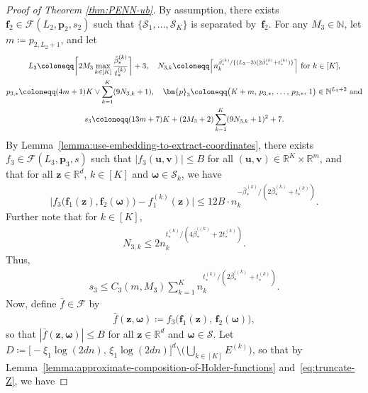 \documentclass[12pt]{article}
\begin{document}
\begin{proof}[Proof of Theorem \ref{thm:PENN-ub}]
    By assumption, there exists $\bm f_2 \in \mathcal{F}(L_2,\bm p_2,s_2)$ such that $\{\mathcal{S}_1,\ldots,\mathcal{S}_K\}$ is separated by~$\bm f_2$.  For any $M_3 \in \mathbb{N}$, let $m\coloneqq p_{2,L_2+1}$, and let
    \begin{gather*}
        L_3 \coloneqq \biggl\lceil 2M_3 \max_{k\in[K]} \frac{\bar{\beta}^{(k)}_*}{t^{(k)}_*} \biggr\rceil  +3,\quad
        N_{3,k} \coloneqq \Bigl\lceil n_k^{\bar\beta^{(k)}_* / \{(L_3-3)(2\bar\beta^{(k)}_* + t^{(k)}_*)\}} \Bigr\rceil \text{ for }k\in[K],\\
        p_{3,*} \coloneqq (4m+1)K \vee \sum_{k=1}^K (9N_{3,k}+1),\quad
        \bm{p}_3 \coloneqq \bigl(K+m,\, p_{3,*},\,\ldots,\,p_{3,*}, \,1\bigr) \in \mathbb{N}^{L_3+2} \text{ and}\\
        s_3 \coloneqq (13m+7)K + (2M_3+2)\sum_{k=1}^K (9N_{3,k}+1)^2 + 7.
    \end{gather*}
    By Lemma~\ref{lemma:use-embedding-to-extract-coordinates}, there exists $f_3 \in \mathcal{F}(L_3,\bm p_3, s)$ such that $|f_3(\bm u, \bm v)| \leq B$ for all $(\bm u,\bm v) \in \mathbb{R}^K \times \mathbb{R}^m$, and that for all $\bm z \in \mathbb{R}^d$, $k\in[K]$ and $\bm\omega \in \mathcal{S}_k$, we have
    \begin{align}
        \bigl| f_3\bigl(\bm f_1(\bm z), \bm f_2(\bm\omega)\bigr) - f_1^{(k)}(\bm z) \bigr| \leq 12B \cdot n_k^{-\bar\beta^{(k)}_* / (2\bar\beta^{(k)}_* + t^{(k)}_*)}. \label{eq:extract-coordinate-error}
    \end{align}
    Further note that for $k\in[K]$,
    \begin{align*}
        N_{3,k} \leq 2n_k^{t_*^{(k)} / (4\bar{\beta}_*^{((k)} + 2t_*^{(k)})}. 
    \end{align*}
    Thus,
    \begin{align*}
        s_3 \leq C_3(m,M_3) \sum_{k=1}^K n_k^{t_*^{(k)} / (2\bar{\beta}_*^{((k)} + t_*^{(k)})}.
    \end{align*}
    Now, define $\bar{f} \in \mathcal{F}$ by
    \begin{align*}
        \bar{f}(\bm{z},\bm{\omega}) \coloneqq f_3 \bigl( \bm{f}_1(\bm{z}),\, \bm f_2(\bm{\omega}) \bigr),
    \end{align*}
    so that $|\bar{f}(\bm{z},\bm{\omega})| \leq B$ for all $\bm z \in \mathbb{R}^d$ and $\bm\omega \in \mathcal{S}$.
    Let $D\coloneqq \bigl[-\xi_1\log(2dn),\,\xi_1\log(2dn)\bigr]^d \setminus \bigl(\bigcup_{k\in[K]}E^{(k)}\bigr)$, so that by Lemma~\ref{lemma:approximate-composition-of-Holder-functions} and~\eqref{eq:truncate-Z}, we have

\end{proof}
\end{document}
